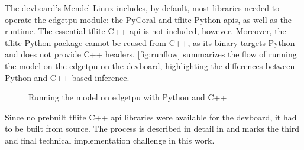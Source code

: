 {The \gls{devboard}'s Mendel Linux includes, by default, most libraries needed to operate the \gls{edgetpu} module:
the PyCoral and \gls{tflite} Python \glspl{api}, as well as the  runtime.
The essential \gls{tflite} C++ \gls{api} is not included, however.
Moreover, the \gls{tflite} Python package cannot be reused from C++, as its binary targets Python and does not provide C++ headers.
\autoref{fig:runflow} summarizes the flow of running the model on the \gls{edgetpu} on the \gls{devboard}, highlighting the differences between Python and C++ based inference.

\begin{figure}[H]
\centering
{}
\caption{Running the model on \gls{edgetpu} with Python and C++}
\label{fig:runflow}
\end{figure}

Since no prebuilt \gls{tflite} C++ \gls{api} libraries were available for the \gls{devboard}, it had to be built from source.
The process is described in detail in 
and marks the third and final technical implementation challenge in this work.

}
